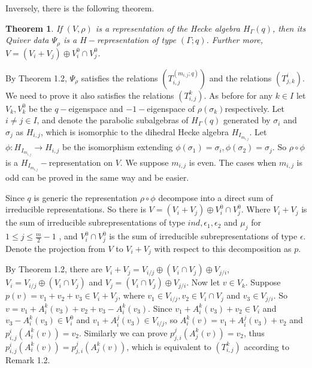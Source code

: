 \def\CTEXPreproc{Created by ctex v0.2.12, don't edit!}\documentclass[11pt]{article}
\newtheorem{thm}{Theorem}[section]
\begin{document}
Inversely, there is  the following theorem.

\begin{thm} If $(V, \rho)$ is a representation of the Hecke algebra $H_{\Gamma}(q)$, then its Quiver data $\Psi _{\rho}$ is a
$H-$representation of type $(\Gamma ;q)$. Further more, $V = (  V_i + V_j ) \oplus V^0 _i \cap V^0 _j  $.

\end{thm}

\begin{pf} By Theorem 1.2, $\Psi _{\rho}$ satisfies the relations $(T^{(m_{i,j};q)}_{i,j})$ and the relations $(T^i_{j,k})$. We need to prove
it also satisfies the relations $(T^k _{i,j})$. As before for any $k\in I$ let $V_k , V^0 _{k}$ be the
$q-$eigenspace and $-1 -$eigenspace of $\rho(\sigma_k )$respectively. Let $i\neq j \in I$,  and denote the parabolic subalgebras of
$H_{\Gamma}(q)$ generated by $\sigma_i $ and $\sigma_j $ as $H_{i,j}$, which is isomorphic to the dihedral Hecke algebra
$H_{I_{m_{i,j}}}$. Let $\phi: H_{I_{m_{i,j}}}\rightarrow H_{i,j} $ be the isomorphism extending
$ \phi(\sigma_1)=\sigma_i , \phi(\sigma_2)=\sigma_j  $. So $\rho\circ\phi$ is a $H_{I_{m_{i,j}}}-$representation on $V$. We suppose
$m_{i,j}$ is even. The cases when $m_{i,j}$ is odd can be proved in the same way and be easier.




Since $q$ is generic the representation $\rho\circ\phi$ decompose into a direct sum of irreducible representations. So there is
 $V = (  V_i + V_j ) \oplus V^0 _i \cap V^0 _j $. Where $V_i +V_j $ is the sum of irreducible subrepresentations of type
     $ind, \epsilon_1 ,\epsilon_2 $ and $\mu_j$ for $1\leq j\leq \frac{m}{2}-1$ , and $V^0 _i \cap V^0 _j$ is the sum of irreducible
     subrepresentations of type $\epsilon$.  Denote the projection from $V$ to $V_i + V_j$ with respect to this decomposition as $p$.

      By Theorem 1.2, there are $V_i + V_j = V_{i/j} \oplus ( V_{i} \cap V_j ) \oplus V_{j/i}$, $V_i = V_{i/j} \oplus ( V_{i} \cap V_j ) $
      and $V_j = ( V_{i} \cap V_j ) \oplus V_{j/i}$.   Now let $v\in V_k$. Suppose $p(v) = v_1 + v_2 + v_3 \in V_i + V_j$, where
      $v_1 \in V_{i/j} , v_2 \in V_i \cap V_j $ and $v_3 \in V_{j/i}$. So $v= v_1 + A^k _i (v_3 )+ v_2 + v_3 - A^k _i (v_3)$. Since
      $  v_1 + A^k _i (v_3 )+ v_2 \in V_i  $ and $   v_3 - A^k _i (v_3) \in V^0 _i $ and $ v_1 + A^j _i (v_3) \in V_{i/j} $, so $A^k _i (v)= v_1 + A^j _i (v_3) + v_2$ and  $ p^i _{i,j} ( A^k _i (v)  )= v_2 $.  Similarly we can prove $ p^j _{j,i} ( A^k _j (v)  )= v_2  $,  thus $ p^i _{i,j} ( A^k _i (v)  )= p^j _{j,i} ( A^k _j (v)  )  $, which is equivalent to $(T^k _{i,j})$ according to Remark 1.2.

   \end{pf}
\end{document}
